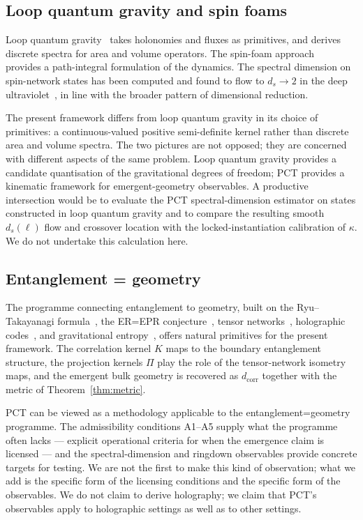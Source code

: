 ﻿\documentclass[12pt,a4paper]{article}
\theoremstyle{definition}
\begin{document}
\subsection{Loop quantum gravity and spin foams}
\label{sec:conn_lqg}

Loop quantum gravity~\citep{rovelli,ashtekar,thiemann} takes holonomies and fluxes as primitives, and derives discrete spectra for area and volume operators. The spin-foam approach~\citep{perez} provides a path-integral formulation of the dynamics. The spectral dimension on spin-network states has been computed and found to flow to $d_s \to 2$ in the deep ultraviolet~\citep{modesto}, in line with the broader pattern of dimensional reduction.

The present framework differs from loop quantum gravity in its choice of primitives: a continuous-valued positive semi-definite kernel rather than discrete area and volume spectra. The two pictures are not opposed; they are concerned with different aspects of the same problem. Loop quantum gravity provides a candidate quantisation of the gravitational degrees of freedom; PCT provides a kinematic framework for emergent-geometry observables. A productive intersection would be to evaluate the PCT spectral-dimension estimator on states constructed in loop quantum gravity and to compare the resulting smooth $d_s(\ell)$ flow and crossover location with the locked-instantiation calibration of $\kappa$. We do not undertake this calculation here.

\subsection{Entanglement = geometry}
\label{sec:conn_ent_geom}

The programme connecting entanglement to geometry, built on the Ryu--Takayanagi formula~\citep{ryu}, the ER=EPR conjecture~\citep{maldacena}, tensor networks~\citep{swingle}, holographic codes~\citep{pastawski}, and gravitational entropy~\citep{faulkner}, offers natural primitives for the present framework. The correlation kernel $K$ maps to the boundary entanglement structure, the projection kernels $\Pi$ play the role of the tensor-network isometry maps, and the emergent bulk geometry is recovered as $d_{\mathrm{corr}}$ together with the metric of Theorem~\ref{thm:metric}.

PCT can be viewed as a methodology applicable to the entanglement=geometry programme. The admissibility conditions A1--A5 supply what the programme often lacks --- explicit operational criteria for when the emergence claim is licensed --- and the spectral-dimension and ringdown observables provide concrete targets for testing. We are not the first to make this kind of observation; what we add is the specific form of the licensing conditions and the specific form of the observables. We do not claim to derive holography; we claim that PCT's observables apply to holographic settings as well as to other settings.
\end{document}
